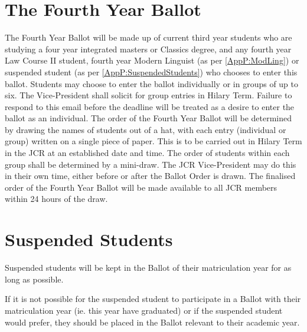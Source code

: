 \section{The Fourth Year Ballot}

\npara The Fourth Year Ballot will be made up of current third year students who are studying a four year integrated masters or Classics degree, and any fourth year Law Course II student, fourth year Modern Linguist (as per \ref{AppP:ModLing}) or suspended student (as per \ref{AppP:SuspendedStudents}) who chooses to enter this ballot.
\npara Students may choose to enter the ballot individually or in groups of up to six. The Vice-President shall solicit for group entries in Hilary Term. Failure to respond to this email before the deadline will be treated as a desire to enter the ballot as an individual.
\npara The order of the Fourth Year Ballot will be determined by drawing the names of students out of a hat, with each entry (individual or group) written on a single piece of paper. This is to be carried out in Hilary Term in the JCR at an established date and time. The order of students within each group shall be determined by a mini-draw. The JCR Vice-President may do this in their own time, either before or after the Ballot Order is drawn.
\npara The finalised order of the Fourth Year Ballot will be made available to all JCR members within 24 hours of the draw.

\section{Suspended Students} 

\npara \label{AppP:SuspendedStudents} Suspended students will be kept in the Ballot of their matriculation year for as long as possible.

\npara \label{AppP:SuspendedAcademicYear} If it is not possible for the suspended student to participate in a Ballot with their matriculation year (ie. this year have graduated) or if the suspended student would prefer, they should be placed in the Ballot relevant to their academic year.

